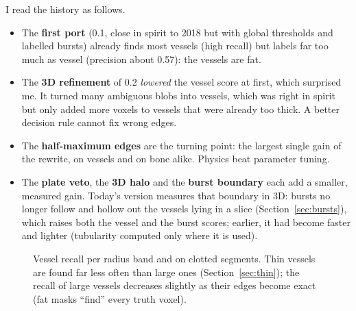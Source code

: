 I read the history as follows.
\begin{itemize}
  \item The \textbf{first port} (0.1, close in spirit to 2018 but with global thresholds and labelled
        bursts) already finds most vessels (high recall) but labels far too much as vessel (precision
        about 0.57): the vessels are fat.
  \item The \textbf{3D refinement} of 0.2 \emph{lowered} the vessel score at first, which surprised me. It turned many
        ambiguous blobs into vessels, which was right in spirit but only added more voxels to vessels
        that were already too thick. A better decision rule cannot fix wrong edges.
  \item The \textbf{half-maximum edges} are the turning point: the largest single gain of the rewrite,
        on vessels and on bone alike. Physics beat parameter tuning.
  \item The \textbf{plate veto}, the \textbf{3D halo} and the \textbf{burst boundary} each add a
        smaller, measured gain. Today's version measures that boundary in 3D: bursts no longer follow
        and hollow out the vessels lying in a slice (Section~\ref{sec:bursts}), which raises both the
        vessel and the burst scores; earlier, it had become faster and lighter (tubularity computed
        only where it is used).
\end{itemize}

\begin{figure}[ht]
\centering
{}
\caption{Vessel recall per radius band and on clotted segments. Thin vessels are found far less often
  than large ones (Section~\ref{sec:thin}); the recall of large vessels decreases slightly as their
  edges become exact (fat masks ``find'' every truth voxel).}
\label{fig:history-recall}
\end{figure}

